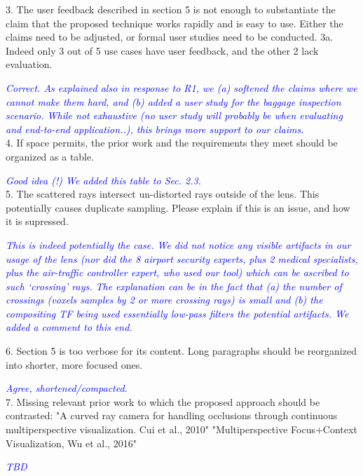 \documentclass[a4paper,10pt]{article}
\newcommand{\rr}[1]{\emph{\textcolor{blue}{#1}}}
\begin{document}
    3. The user feedback described in section 5 is not enough to substantiate the
    claim that the proposed technique works rapidly and is easy to use. Either the
    claims need to be adjusted, or formal user studies need to be conducted.
    3a. Indeed only 3 out of 5 use cases have user feedback, and the other 2 lack
    evaluation.
    
    \rr{Correct. As explained also in response to R1, we (a) softened the claims where we cannot make them hard, and (b) added a user study for the baggage inspection scenario. While not exhaustive (no user study will probably be when evaluating and end-to-end application..), this brings more support to our claims.}\\
    
    
    4. If space permits, the prior work and the requirements they meet should be
    organized as a table.
    
    \rr{Good idea (!) We added this table to Sec. 2.3.}\\
    
    5. The scattered rays intersect un-distorted rays outside of the lens. This
    potentially causes duplicate sampling. Please explain if this is an issue, and how
    it is supressed.
    
    \rr{This is indeed potentially the case. We did not notice any visible artifacts in our usage of the lens (nor did the 8 airport security experts, plus 2 medical specialists, plus the air-traffic controller expert, who used our tool) which can be ascribed to such `crossing' rays. The explanation can be in the fact that (a) the number of crossings (voxels samples by 2 or more crossing rays) is small and (b) the compositing TF being used essentially low-pass filters the potential artifacts. We added a comment to this end.}
    
    6. Section 5 is too verbose for its content. Long paragraphs should be reorganized
    into shorter, more focused ones.
    
    \rr{Agree, shortened/compacted.}\\
    
    7. Missing relevant prior work to which the proposed approach should be
    contrasted:
    "A curved ray camera for handling occlusions through continuous multiperspective
    visualization. Cui et al., 2010"
    "Multiperspective Focus+Context Visualization, Wu et al., 2016"

    \rr{TBD}\\    
    
\end{document}
